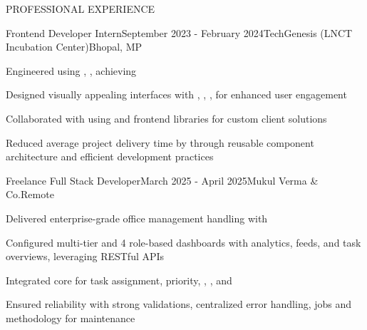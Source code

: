 \documentclass{resume}
\begin{document}
\begin{rSection}{PROFESSIONAL EXPERIENCE}

\begin{rExperience}{Frontend Developer Intern}{September 2023 - February 2024}{TechGenesis (LNCT Incubation Center)}{Bhopal, MP}
\item Engineered  using , ,  achieving 
\item Designed visually appealing interfaces with , , ,  for enhanced user engagement
\item Collaborated with  using  and frontend libraries for custom client solutions
\item Reduced average project delivery time by  through reusable component architecture and efficient development practices
\end{rExperience}

\begin{rExperience}{Freelance Full Stack Developer}{March 2025 - April 2025}{Mukul Verma \& Co.}{Remote}
\item Delivered enterprise-grade office management  handling  with 
\item Configured multi-tier  and 4 role-based dashboards with analytics, feeds, and task overviews, leveraging RESTful APIs
\item Integrated core  for task assignment, priority, , , and 
\item Ensured reliability with strong validations, centralized error handling,  jobs and  methodology for maintenance
\end{rExperience}

\end{rSection}
\end{document}
